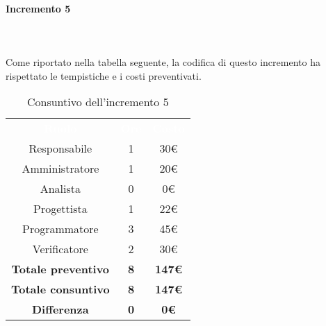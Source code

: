 \paragraph*{Incremento 5} \mbox{} \\ \mbox{} \\
Come riportato nella tabella seguente, la codifica di questo incremento ha rispettato le tempistiche e i costi preventivati.
\begin{table}[H]
\centering\renewcommand{\arraystretch}{1.5}
\caption{Consuntivo dell'incremento 5}
\vspace{0.2cm}
\begin{tabular}{ c c c }
\rowcolor{redafk}
\textcolor{white}{\textbf{Ruolo}} & \textcolor{white}{\textbf{Ore}} &
\textcolor{white}{\textbf{Costo}}  \\
Responsabile 	& 1 & 30€ \\
Amministratore 	& 1 & 20€ \\
Analista 		& 0 & 0€ \\
Progettista		& 1 & 22€ \\
Programmatore	& 3 & 45€ \\
Verificatore 	& 2 & 30€ \\
\textbf{Totale preventivo} & \textbf{8} & \textbf{147€}  \\
\textbf{Totale consuntivo} & \textbf{8} & \textbf{147€}  \\
\rowcolor{lastrowcolor}
\textbf{Differenza} & \textbf{0} & \textbf{0€} \\
\end{tabular}
\end{table}

